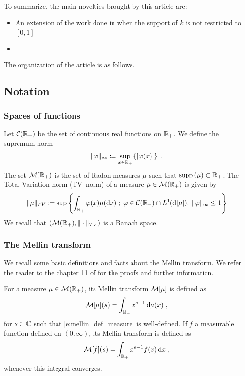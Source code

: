 \documentclass[11pt]{amsart}
\newcommand{\R}{\RR}
\newcommand{\diff}{\,\mathrm{d}}
\newcommand{\dd}{\mathrm{d}}
\newcommand{\supp}{\mathrm{supp}\,}
\begin{document}
To summarize, the main novelties brought by this article are: 
\begin{itemize}
    \item An extension of the work done in \cite{doumic2016time} when the support of $k$ is not restricted to $[0,1]$
    \item 
\end{itemize}

The organization of the article is as follows.

\subsection{Notation}

\subsubsection{Spaces of functions}

Let $\mathcal{C}(\mathbb{R}_+)$ be the set of continuous real functions on $\mathbb{R}_+$. We define the supremum norm
\begin{equation*}
    \|\varphi\|_{\infty} \coloneqq\sup_{x \in \mathbb{R}_+} \left\{ |\varphi(x)| \right\}
    \; .
\end{equation*}
The set $\mathcal{M}(\mathbb{R}_+)$ is the set of Radon measures $\mu$ such that $\supp(\mu) \subset \RR_+$. The Total Variation norm (TV--norm) of a measure $\mu \in \mathcal{M}(\mathbb{R}_+)$ is given by 
    \begin{equation*}
        \|\mu\|_{TV} \coloneqq\sup \left\{ \int_{\RR_+} \varphi(x) \mu(\dd x)\; ; \; \varphi \in \Ccal(\RR_+)\cap L^1(\dd|\mu|),\; \|\varphi\|_{\infty} \leq 1\right\}
    \end{equation*}
We recall that $\left(\mathcal{M}(\mathbb{R}_+), \|\cdot\|_{TV}\right)$ is a Banach space. 

\subsubsection{The Mellin transform}

We recall some basic definitions and facts about the Mellin transform. We refer the reader to the chapter 11 of \cite{misra1986transform} for the proofs and further information. 

\begin{definition} For a measure $\mu \in \Mcal(\R_+)$, its Mellin transform $\mathcal{M}[\mu]$ is defined as 
\begin{equation}
        \label{e:mellin_def_measure}
        \Mcal[\mu](s) = \int_{\RR_+} x^{s-1} \diff \mu(x) \eqfinv
    \end{equation}
    for $s \in \mathbb{C}$ such that \eqref{e:mellin_def_measure} is well-defined.     
If $f$ a measurable function defined on $(0, \infty)$, its Mellin transform is defined as 
\begin{equation}
    \label{e:mellin_def_function}
    \Mcal[f](s) = \int_{\RR_+} x^{s-1} f(x) \diff x \eqfinv
\end{equation}
whenever this integral converges. 
\end{definition}
\end{document}
